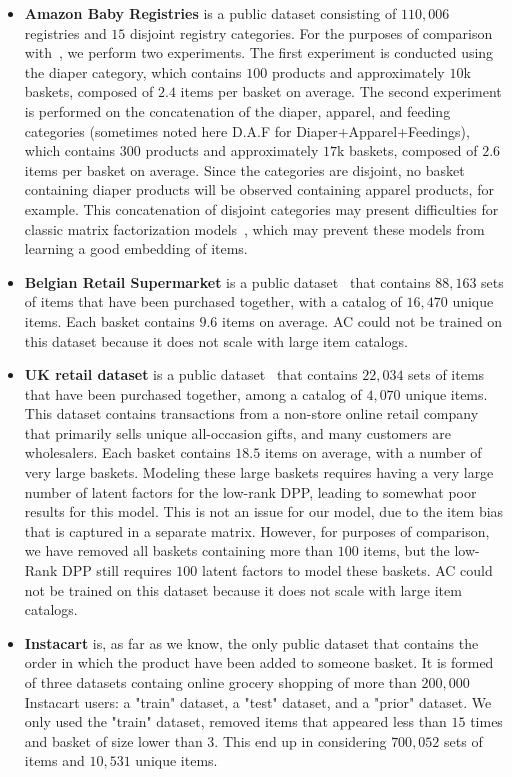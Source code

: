 \begin{itemize}
\item \textbf{Amazon Baby Registries} is a public dataset consisting of $110,006$
registries and $15$ disjoint registry categories. For the purposes of comparison
with~\cite{DBLP:conf/recsys/GartrellPK16}, we perform two experiments.  The
first experiment is conducted using the diaper category, which contains $100$
products and approximately $10$k baskets, composed of $2.4$ items per basket on
average.  The second experiment is performed on the concatenation of the diaper,
apparel, and feeding categories (sometimes noted here D.A.F for Diaper+Apparel+Feedings), 
which contains $300$ products and approximately
$17$k baskets, composed of $2.6$ items per basket on average. Since the
categories are disjoint, no basket containing diaper products will be observed
containing apparel products, for example. This concatenation of disjoint
categories may present difficulties for classic matrix factorization
models~\cite{DBLP:conf/recsys/GartrellPK16}, which may prevent these models from
learning a good embedding of items.
\item \textbf{Belgian Retail Supermarket} is a public
dataset~\cite{brijs99using} that contains $88,163$ sets of items that have been
purchased together, with a catalog of $16,470$ unique items. Each basket
contains $9.6$ items on average. 
AC could not be trained on this dataset because it does not scale with large item catalogs.
\item \textbf{UK retail dataset} is a public dataset~\cite{Chen2012} that
contains $22,034$ sets of items that have been purchased together, among a
catalog of $4,070$ unique items.  This dataset contains transactions from a
non-store online retail company that primarily sells unique all-occasion gifts,
and many customers are wholesalers. Each basket contains $18.5$ items on
average, with a number of very large baskets.  Modeling these large baskets
requires having a very large number of latent factors for the low-rank DPP,
leading to somewhat poor results for this model. This is not an issue for our
model, due to the item bias that is captured in a separate matrix. However, for
purposes of comparison, we have removed all baskets containing more than $100$
items, but the low-Rank DPP still requires $100$ latent factors to model these
baskets. 
AC could not be trained on this dataset because it does not scale with large item catalogs.
\item \textbf{Instacart} is, as far as we know, the only public dataset that contains the 
order in which the product have been added to someone basket. It is formed of three datasets 
containg online grocery shopping of more than $200,000$ Instacart users: a "train" dataset, 
a "test" dataset, and a "prior" dataset. We only used the "train" dataset, removed items 
that appeared less than $15$ times and basket of size lower than $3$. This end up in 
considering $700,052$ sets of items and $10,531$ unique items.
\end{itemize}

